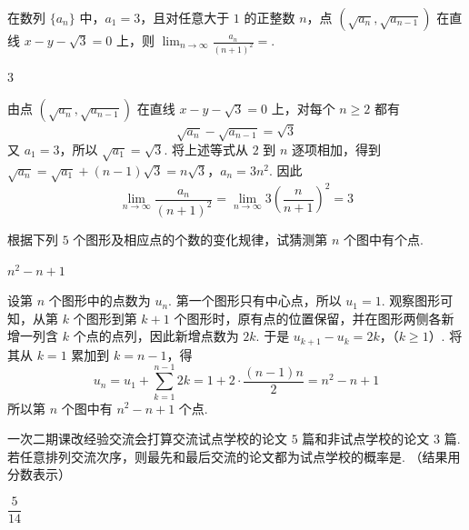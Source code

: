 \begin{problem}
在数列 \(\{a_{n}\}\) 中，\(a_{1}=3\)，且对任意大于 \(1\) 的正整数 \(n\)，点 \((\sqrt{a_n},\sqrt{a_{n-1}})\) 在直线 \(x-y-\sqrt{3}=0\) 上，则 \(\displaystyle\lim_{n\to\infty} \frac{a_n}{(n+1)^2}=\)\fillinblank{}.
\end{problem}

\begin{answer}
3
\end{answer}

\begin{solution}
由点 \((\sqrt{a_n},\sqrt{a_{n-1}})\) 在直线 \(x-y-\sqrt{3}=0\) 上，对每个 \(n\geqslant2\) 都有
\[
\sqrt{a_n}-\sqrt{a_{n-1}}=\sqrt{3}
\]
又 \(a_1=3\)，所以 \(\sqrt{a_1}=\sqrt{3}\). 将上述等式从 \(2\) 到 \(n\) 逐项相加，得到
\(\sqrt{a_n}=\sqrt{a_1}+(n-1)\sqrt{3}=n\sqrt{3}\)，\(a_n=3n^2\).
因此
\[
\lim_{n\to\infty}\frac{a_n}{(n+1)^2}
=\lim_{n\to\infty}3\left(\frac{n}{n+1}\right)^2=3
\]
\end{solution}

\begin{problem}
根据下列 \(5\) 个图形及相应点的个数的变化规律，试猜测第 \(n\) 个图中有\fillinblank{}个点.
\end{problem}

\begin{answer}
\(n^2-n+1\)
\end{answer}

\begin{solution}
设第 \(n\) 个图形中的点数为 \(u_n\). 第一个图形只有中心点，所以 \(u_1=1\). 观察图形可知，从第 \(k\) 个图形到第 \(k+1\) 个图形时，原有点的位置保留，并在图形两侧各新增一列含 \(k\) 个点的点列，因此新增点数为 \(2k\). 于是
\(u_{k+1}-u_k=2k\)，（\(k\geqslant1\)）.
将其从 \(k=1\) 累加到 \(k=n-1\)，得
\[
u_n=u_1+\sum_{k=1}^{n-1}2k
=1+2\cdot\frac{(n-1)n}{2}
=n^2-n+1
\]
所以第 \(n\) 个图中有 \(n^2-n+1\) 个点.
\end{solution}

\begin{problem}
一次二期课改经验交流会打算交流试点学校的论文 \(5\) 篇和非试点学校的论文 \(3\) 篇. 若任意排列交流次序，则最先和最后交流的论文都为试点学校的概率是\fillinblank{}. （结果用分数表示）
\end{problem}

\begin{answer}
\(\dfrac{5}{14}\)
\end{answer}

